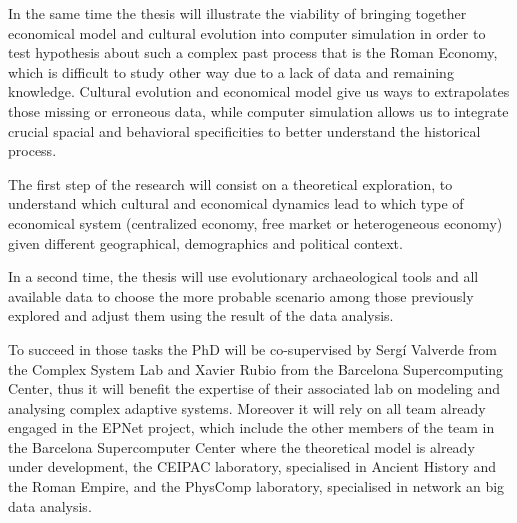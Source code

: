 \documentclass[a4paper]{article}
\begin{document}
In the same time the thesis will illustrate the viability of bringing together economical model and cultural evolution into computer simulation in order to test hypothesis about such a complex past process that is the Roman Economy, which is difficult to study other way due to a lack of data and remaining knowledge. Cultural evolution and economical model give us ways to extrapolates those missing or erroneous data, while computer simulation allows us to integrate crucial spacial and behavioral specificities to better understand the historical process.




The first step of the research will consist on a theoretical exploration, to understand which cultural and economical dynamics lead to which type of economical system (centralized economy, free market or heterogeneous economy) given different geographical, demographics and political context.

In a second time, the thesis will use evolutionary archaeological tools and all available data to choose the more probable scenario among those previously explored and adjust them using the result of the data analysis.

To succeed in those tasks the PhD will be co-supervised by Sergí Valverde from the Complex System Lab and Xavier Rubio from the Barcelona Supercomputing Center, thus it will benefit the expertise of their associated lab on modeling and analysing complex adaptive systems. Moreover it will rely on all team already engaged in the EPNet project, which include the other members of the team in the Barcelona Supercomputer Center where the theoretical model is already under development, the CEIPAC laboratory, specialised in Ancient History and the Roman Empire, and the PhysComp laboratory, specialised in network an big data analysis.
\end{document}
